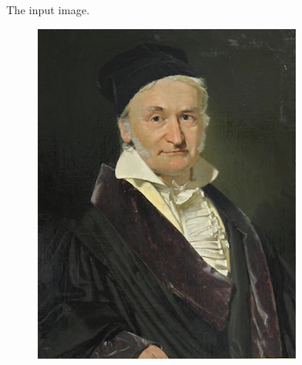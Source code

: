 \documentclass[]{article}
\begin{document}
The input image.
\begin{figure}
    \includegraphics{input2.png}
\end{figure}
\end{document}
